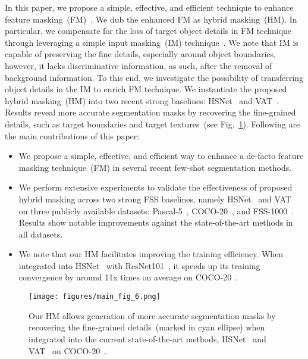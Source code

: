 \documentclass[runningheads]{llncs}
\begin{document}
In this paper, we propose a simple, effective, and efficient technique to enhance feature masking~(FM)~\cite{Zhang2020SGOneSG}. We dub the enhanced FM as hybrid masking~(HM). In particular, we compensate for the loss of target object details in FM technique through leveraging a simple input masking~(IM) technique~\cite{OSLSM}. We note that IM is capable of preserving the fine details, especially around object boundaries, however, it lacks discriminative information, as such, after the removal of background information. To this end, we investigate the possibility of transferring object details in the IM to enrich FM technique. We instantiate the proposed hybrid masking~(HM) into two recent strong baselines: HSNet~\cite{HSNet} and VAT~\cite{VAT}. Results reveal more accurate segmentation masks by recovering the fine-grained details, such as target boundaries and target textures~(see Fig.~\ref{fig:teaser1}).
Following are the main contributions of this paper:
\begin{itemize}
    \item We propose a simple, effective,  and efficient way to enhance a de-facto feature masking technique~(FM) in several recent few-shot segmentation methods. 
    \item We perform extensive experiments to validate the effectiveness of proposed hybrid masking across two strong FSS baselines, namely HSNet~\cite{HSNet} and VAT~\cite{VAT} on three publicly available datasets: Pascal-5~\cite{OSLSM}, COCO-20~\cite{lin2015microsoft}, and FSS-1000~\cite{FSS1000}. 
Results show notable improvements against the state-of-the-art methods in all datasets. \item We note that our HM facilitates improving the training efficiency. When integrated into HSNet~\cite{HSNet} with ResNet101~\cite{Resnet}, it speeds up its training convergence by around 11x times on average on COCO-20~\cite{lin2015microsoft}.
    
\end{itemize}



\begin{figure}[t]
\centering
\texttt{[image: figures/main\_fig\_6.png]}
\caption{ \small Our HM allows generation of more accurate segmentation masks by recovering the fine-grained details~(marked in cyan ellipse) when integrated into the current state-of-the-art methods, HSNet~\cite{HSNet} and VAT~\cite{VAT} on COCO-20~\cite{lin2015microsoft}.} 

\label{fig:teaser1}
\end{figure}
\end{document}
